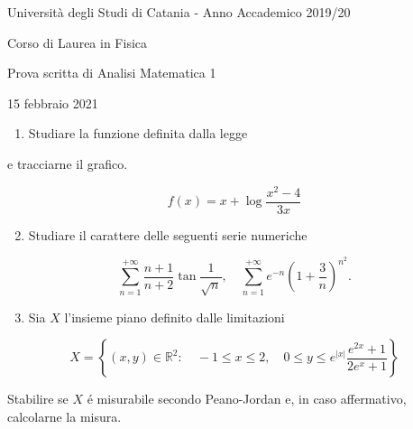 \documentclass[10pt]{article}
\begin{document}
Università degli Studi di Catania - Anno Accademico 2019/20

Corso di Laurea in Fisica

Prova scritta di Analisi Matematica 1

15 febbraio 2021

\begin{enumerate}
  \item Studiare la funzione definita dalla legge
\end{enumerate}

e tracciarne il grafico.

\[
f(x)=x+\log \frac{x^{2}-4}{3 x}
\]

\begin{enumerate}
  \setcounter{enumi}{1}
  \item Studiare il carattere delle seguenti serie numeriche
\end{enumerate}

\[
\sum_{n=1}^{+\infty} \frac{n+1}{n+2} \tan \frac{1}{\sqrt{n}}, \quad \sum_{n=1}^{+\infty} e^{-n}\left(1+\frac{3}{n}\right)^{n^{2}} .
\]

\begin{enumerate}
  \setcounter{enumi}{2}
  \item Sia \(X\) l'insieme piano definito dalle limitazioni
\end{enumerate}

\[
X=\left\{(x, y) \in \mathbb{R}^{2}: \quad-1 \leq x \leq 2, \quad 0 \leq y \leq e^{|x|} \frac{e^{2 x}+1}{2 e^{x}+1}\right\}
\]

Stabilire se \(X\) é misurabile secondo Peano-Jordan e, in caso affermativo, calcolarne la misura.
\end{document}
